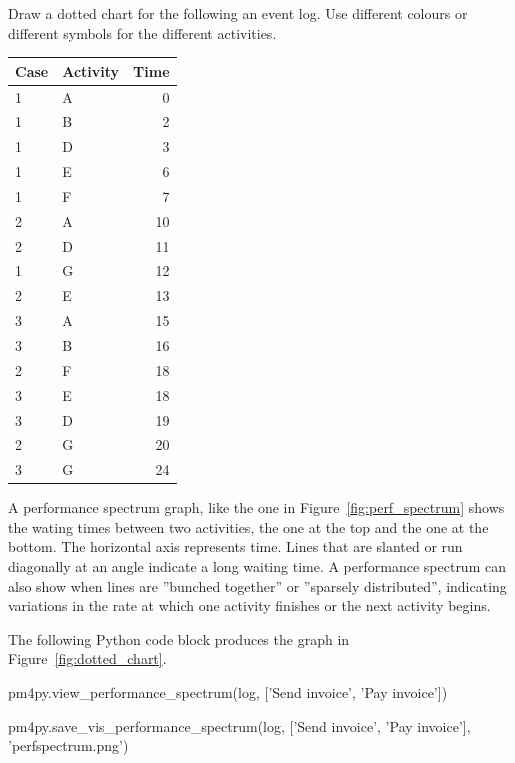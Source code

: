 \begin{exerciseboxpaper}
Draw a dotted chart for the following an event log. Use different colours or different symbols for the different activities. \\ \bigskip

\renewcommand{\arraystretch}{1.25}
\begin{tabular}{l|l|r} \hline
{\bf Case} & {\bf Activity} & {\bf Time} \\ \hline
1 & A & 0 \\
1 & B & 2 \\
1 & D & 3 \\ 
1 & E & 6 \\ 
1 & F & 7 \\ 
2 & A & 10 \\
2 & D & 11 \\
1 & G & 12 \\ 
2 & E & 13 \\ 
3 & A & 15 \\
3 & B & 16 \\
2 & F & 18 \\ 
3 & E & 18 \\
3 & D & 19 \\
2 & G & 20 \\
3 & G & 24 \\
\end{tabular}
\end{exerciseboxpaper}

A performance spectrum graph, like the one in Figure~\ref{fig:perf_spectrum} shows the wating times between two activities, the one at the top and the one at the bottom. The horizontal axis represents time. Lines that are slanted or run diagonally at an angle indicate a long waiting time. A performance spectrum can also show when lines are ''bunched together'' or ''sparsely distributed'', indicating variations in the rate at which one activity finishes or the next activity begins. 
\begin{withcode}
The following Python code block produces the graph in Figure~\ref{fig:dotted_chart}.

\begin{pythoncode}
pm4py.view_performance_spectrum(log,
    ['Send invoice', 'Pay invoice'])

pm4py.save_vis_performance_spectrum(log,
    ['Send invoice', 'Pay invoice'],
    'perfspectrum.png') 
\end{pythoncode}
\end{withcode}

